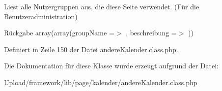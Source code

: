 Liest alle Nutzergruppen aus, die diese Seite verwendet. (Für die Benutzeradministration) \begin{DoxyReturn}{Rückgabe}
array(array(\textquotesingle{}group\+Name\textquotesingle{} =$>$ \textquotesingle{}\textquotesingle{}, \textquotesingle{}beschreibung\textquotesingle{} =$>$ \textquotesingle{}\textquotesingle{})) 
\end{DoxyReturn}


Definiert in Zeile 150 der Datei andere\+Kalender.\+class.\+php.



Die Dokumentation für diese Klasse wurde erzeugt aufgrund der Datei\+:\begin{DoxyCompactItemize}
\item 
Upload/framework/lib/page/kalender/andere\+Kalender.\+class.\+php\end{DoxyCompactItemize}
